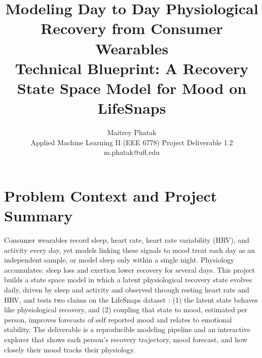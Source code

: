 \documentclass[11pt]{article}
\title{\vspace{-1.4cm}\textbf{Modeling Day to Day Physiological Recovery from Consumer Wearables}\\[2pt]
\large Technical Blueprint: A Recovery State Space Model for Mood on LifeSnaps\vspace{-0.2cm}}
\author{Maitrey Phatak \\ \small Applied Machine Learning II (EEE 6778) \quad Project Deliverable 1.2 \quad m.phatak@ufl.edu}
\date{\vspace{-0.7cm}}
\begin{document}
\maketitle

\section{Problem Context and Project Summary}
Consumer wearables record sleep, heart rate, heart rate variability (HRV), and activity every day, yet models linking these signals to mood treat each day as an independent sample, or model sleep only within a single night. Physiology accumulates: sleep loss and exertion lower recovery for several days. This project builds a state space model in which a latent physiological recovery state evolves daily, driven by sleep and activity and observed through resting heart rate and HRV, and tests two claims on the LifeSnaps dataset \cite{lifesnaps}: (1) the latent state behaves like physiological recovery, and (2) coupling that state to mood, estimated per person, improves forecasts of self reported mood and relates to emotional stability. The deliverable is a reproducible modeling pipeline and an interactive explorer that shows each person's recovery trajectory, mood forecast, and how closely their mood tracks their physiology.
\end{document}
